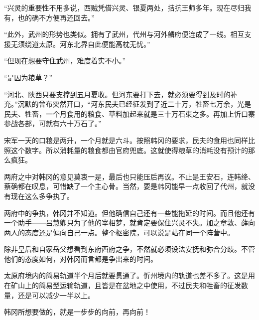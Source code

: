 “兴灵的重要性不用多说，西贼凭借兴灵、银夏两处，拮抗王师多年。现在尽归我有，也的确不方便再还回去。”

“此外，武州的形势也类似。拥有了武州，代州与河外麟府便连成了一线。相互支援无须绕道太原。河东北界自此便能高枕无忧。”

“但现在想要守住武州，难度着实不小。”

“是因为粮草？”

“河北、陕西只要支撑到五月夏收。但河东要打下去，就必须要得到及时的补充。”沉默的曾布突然开口，“河东民夫已经征发到了近二十万，牲畜七万余，光是民夫、牲畜，一个月食用的粮食、草料加起来就是三十万石束之多。再加上忻口寨参战各部，可就有六十万石了。”

宋军一天的口粮是两升，一个月就是六斗。按照韩冈的要求，民夫的食用也同样比照这个数字。所以消耗量的粮食都由官府兜底。这就使得粮草的消耗没有预计的那么疯狂。

两府之中对韩冈的意见莫衷一是，最后也只能压后再议。不止是王安石，连韩绛、蔡确都在叹息，可惜缺了一个主心骨。当然，要是韩冈能早一点收回了代州，就没有现在这么多争执了。

两府中的争执，韩冈并不知道。但他确信自己还有一些能拖延的时间。而且他还有一个助手——吕慧卿只为了他的宰相梦，就肯定要保住兴灵不失。加之章敦、薛向两人的态度还是偏向自己一点。整个枢密院，可以说是站在同一个阵营中。

除非皇后和自家岳父想看到东府西府之争，不然就必须设法安抚和弥合分歧。不管他们的态度如何，对韩冈而言都是争出来的时间。

太原府境内的简易轨道半个月后就要贯通了。忻州境内的轨道也差不多了。这是用在矿山上的简易型运输轨道，且皆是在盆地之中使用，不过民夫和牲畜的征发数量，还是可以减少一半以上。

韩冈所想要做的，就是一步步的向前，再向前！